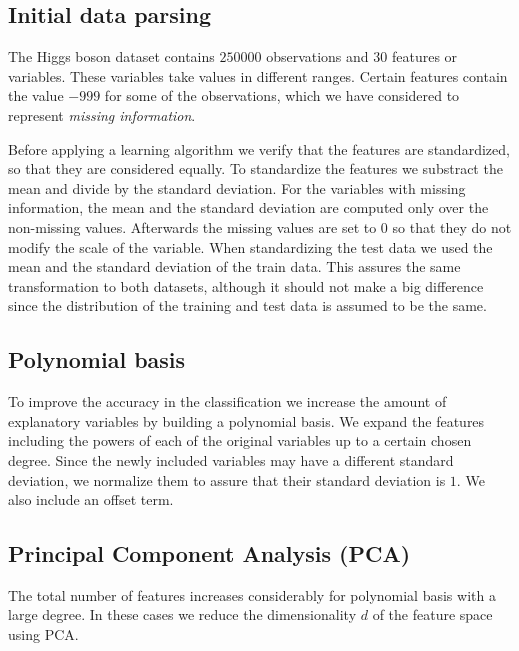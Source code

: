 \documentclass[10pt,conference,compsocconf]{IEEEtran}
\begin{document}
	\subsection{Initial data parsing} %
	\label{sub:initial_data_parsing}
  	The Higgs boson dataset contains $250000$ observations and $30$ features or variables. These variables take values in different ranges. Certain features contain the value $-999$ for some of the observations, which we have considered to represent \emph{missing information}. %

  	Before applying a learning algorithm we verify that the features are standardized,  so that they are considered equally. To standardize the features we substract the mean and divide by the standard deviation. For the variables with missing information, the mean and the standard deviation are computed only over the non-missing values. Afterwards the missing values are set to $0$ so that they do not modify the scale of the variable. When standardizing the test data we used the mean and the standard deviation of the train data. This assures the same transformation to both datasets, although it should not make a big difference since the distribution of the training and test data is assumed to be the same.

	\subsection{Polynomial basis} %
	\label{sub:polynomial_basis}
  	To improve the accuracy in the classification we increase the amount of explanatory variables by building a polynomial basis. We expand the features including the powers of each of the original variables up to a certain chosen degree. Since the newly included variables may have a different standard deviation, we normalize them to assure that their standard deviation is $1$. We also include an offset term.

	\subsection{Principal Component Analysis (PCA)} %
	\label{sub:principal_component_analysis}
  	The total number of features increases considerably for polynomial basis with a large degree. In these cases we reduce the dimensionality $d$ of the feature space using PCA.
\end{document}
